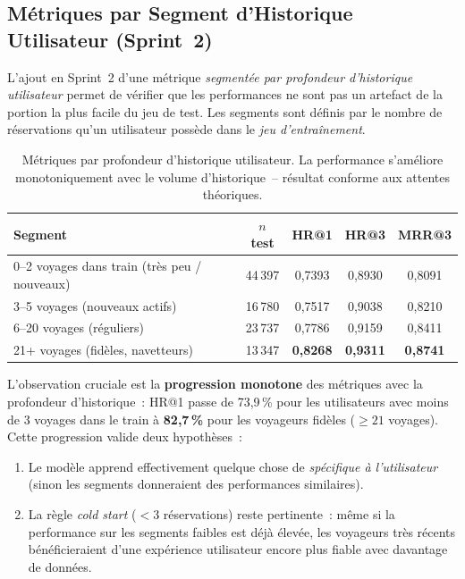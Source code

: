 \documentclass[11pt, a4paper]{article}
\begin{document}
\subsection{Métriques par Segment d'Historique Utilisateur (Sprint~2)}

L'ajout en Sprint~2 d'une métrique \textit{segmentée par profondeur
d'historique utilisateur} permet de vérifier que les performances ne
sont pas un artefact de la portion la plus facile du jeu de test. Les
segments sont définis par le nombre de réservations qu'un utilisateur
possède dans le \textit{jeu d'entraînement}.

\begin{table}[h]
\centering
\small
\begin{tabularx}{\textwidth}{|X|c|c|c|c|}
\hline
\textbf{Segment} & \textbf{$n$ test} & \textbf{HR@1} & \textbf{HR@3} & \textbf{MRR@3} \\
\hline
0--2 voyages dans train (très peu / nouveaux) & 44\,397 & 0{,}7393 & 0{,}8930 & 0{,}8091 \\
\hline
3--5 voyages (nouveaux actifs)               & 16\,780 & 0{,}7517 & 0{,}9038 & 0{,}8210 \\
\hline
6--20 voyages (réguliers)                    & 23\,737 & 0{,}7786 & 0{,}9159 & 0{,}8411 \\
\hline
21+ voyages (fidèles, navetteurs)            & 13\,347 & \textbf{0{,}8268} & \textbf{0{,}9311} & \textbf{0{,}8741} \\
\hline
\end{tabularx}
\caption{Métriques par profondeur d'historique utilisateur. La
performance s'améliore monotoniquement avec le volume d'historique~--
résultat conforme aux attentes théoriques.}
\end{table}

L'observation cruciale est la \textbf{progression monotone} des
métriques avec la profondeur d'historique~: HR@1 passe de 73{,}9\,\%
pour les utilisateurs avec moins de 3 voyages dans le train à
\textbf{82{,}7\,\%} pour les voyageurs fidèles ($\geq 21$ voyages). Cette
progression valide deux hypothèses~:

\begin{enumerate}
\item Le modèle apprend effectivement quelque chose de
    \textit{spécifique à l'utilisateur} (sinon les segments donneraient
    des performances similaires).
\item La règle \textit{cold start} ($< 3$ réservations) reste
    pertinente~: même si la performance sur les segments faibles est
    déjà élevée, les voyageurs très récents bénéficieraient d'une
    expérience utilisateur encore plus fiable avec davantage de
    données.
\end{enumerate}
\end{document}
